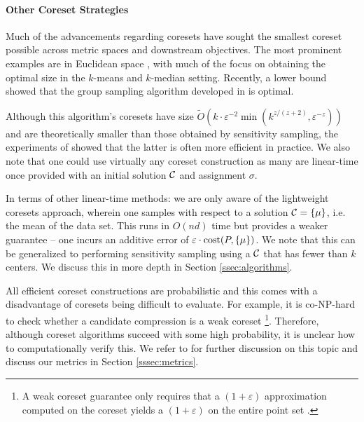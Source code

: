 

\paragraph*{Other Coreset Strategies}
\label{ssec:clustering_prelim}

Much of the advancements regarding coresets have sought the smallest coreset possible across metric spaces and downstream objectives. The most prominent
examples are in Euclidean space \cite{BadoiuHI02, HaM04, Chen09, HuangV20, stoc22}, with much of the focus on obtaining the optimal size in the $k$-means and
$k$-median setting. Recently, a lower bound \cite{huangLB} showed that the group sampling algorithm developed in \cite{stoc21, stoc22} is optimal.

Although this algorithm's coresets have size $\tilde{O}(k\cdot \varepsilon^{-2} \min(k^{z/(z+2)},\varepsilon^{-z}))$ \cite{CLSSS22} and are theoretically smaller than
those obtained by sensitivity sampling, the experiments of \cite{chrisESA} showed that the latter is often more efficient in practice. We also note that one
could use virtually any coreset construction as many are linear-time once provided with an initial solution $\mathcal C$ and assignment $\sigma$.

In terms of other linear-time methods: we are only aware of the lightweight coresets approach\cite{BachemL018}, wherein one
samples with respect to a solution $\mathcal C=\{\mu\}$, i.e. the mean of the data set. This runs in $O(nd)$ time but provides a weaker guarantee -- one incurs an
additive error of $\varepsilon\cdot \operatorname{cost}(P,\{\mu\})$.  We note that this can be generalized to performing sensitivity sampling using a $\mathcal C$ that has fewer
than $k$ centers. We discuss this in more depth in Section \ref{ssec:algorithms}.

All efficient coreset constructions are probabilistic and this comes with a disadvantage of coresets being difficult to evaluate. For example, it is co-NP-hard to
check whether a candidate compression is a weak coreset \footnote{A weak coreset guarantee only requires that a $(1+\varepsilon)$ approximation
computed on the coreset yields a $(1+\varepsilon)$ on the entire point set \cite{chrisESA}.}. Therefore, although coreset algorithms succeed with some high probability, it is
unclear how to computationally verify this. We refer to \cite{chrisESA} for further discussion on this topic and discuss our metrics in Section \ref{sssec:metrics}.

